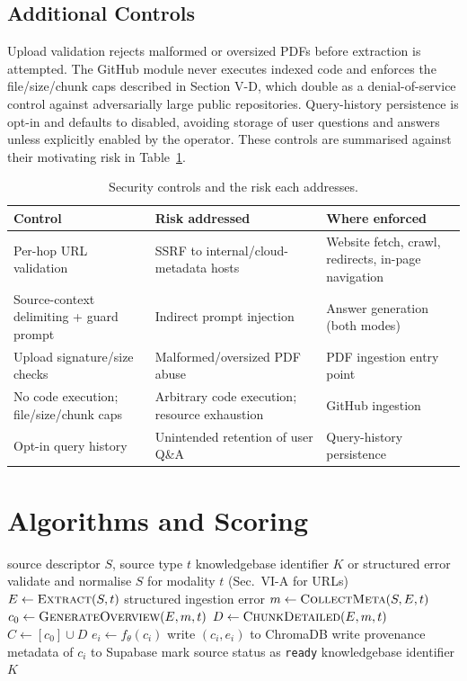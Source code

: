 \documentclass[conference]{IEEEtran}
\begin{document}
\subsection{Additional Controls}
Upload validation rejects malformed or oversized PDFs before extraction
is attempted. The GitHub module never executes indexed code and enforces
the file/size/chunk caps described in Section V-D, which double as a
denial-of-service control against adversarially large public
repositories. Query-history persistence is opt-in and defaults to
disabled, avoiding storage of user questions and answers unless
explicitly enabled by the operator. These controls are summarised
against their motivating risk in Table~\ref{tab:security}.

\begin{table}[t]
\caption{Security controls and the risk each addresses.}
\label{tab:security}
\centering
\begin{tabular}{p{2.1cm}p{2.1cm}p{3.3cm}}
\hline
\textbf{Control} & \textbf{Risk addressed} & \textbf{Where enforced} \\
\hline
Per-hop URL validation & SSRF to internal/cloud-metadata hosts & Website fetch, crawl, redirects, in-page navigation \\
Source-context delimiting + guard prompt & Indirect prompt injection & Answer generation (both modes) \\
Upload signature/size checks & Malformed/oversized PDF abuse & PDF ingestion entry point \\
No code execution; file/size/chunk caps & Arbitrary code execution; resource exhaustion & GitHub ingestion \\
Opt-in query history & Unintended retention of user Q\&A & Query-history persistence \\
\hline
\end{tabular}
\end{table}

\section{Algorithms and Scoring}

\begin{algorithm}[t]
\caption{Multi-source ingestion and indexing}
\begin{algorithmic}[1]
\REQUIRE source descriptor $S$, source type $t$
\ENSURE knowledgebase identifier $K$ or structured error
\STATE validate and normalise $S$ for modality $t$ (Sec.~VI-A for URLs)
\STATE $E \gets \textsc{Extract}(S, t)$
  \RETURN structured ingestion error
\ENDIF
\STATE $m \gets \textsc{CollectMeta}(S, E, t)$
\STATE $c_0 \gets \textsc{GenerateOverview}(E, m, t)$
\STATE $D \gets \textsc{ChunkDetailed}(E, m, t)$
\STATE $C \gets [c_0] \cup D$
  \STATE $e_i \gets f_\theta(c_i)$
  \STATE write $(c_i, e_i)$ to ChromaDB
  \STATE write provenance metadata of $c_i$ to Supabase
\ENDFOR
\STATE mark source status as \texttt{ready}
\RETURN knowledgebase identifier $K$
\end{algorithmic}
\end{algorithm}
\end{document}
